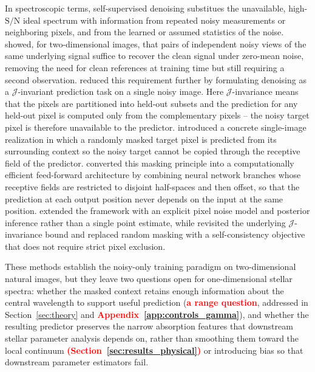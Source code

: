 \documentclass[twocolumn]{aastex7}
\newcommand{\ld}[1]{\textcolor{red}{\textbf{#1}}}
\newcommand{\SNR}{\mathrm{S}/\mathrm{N}}
\begin{document}
In spectroscopic terms, self-supervised denoising substitues the unavailable, high-$\SNR$ ideal spectrum with information from repeated noisy measurements or neighboring pixels, and from the learned or assumed statistics of the noise. \citet{lehtinen2018noise2noise} showed, for two-dimensional images, that pairs of independent noisy views of the same underlying signal suffice to recover the clean signal under zero-mean noise, removing the need for clean references at training time but still requiring a second observation. \citet{batson2019noise2self} reduced this requirement further by formulating denoising as a $\mathcal{J}$-invariant prediction task on a single noisy image. Here $\mathcal{J}$-invariance means that the pixels are partitioned into held-out subsets and the prediction for any held-out pixel is computed only from the complementary pixels -- the noisy target pixel is therefore unavailable to the predictor. \citet{Krull2019_blindspot} introduced a concrete single-image realization in which a randomly masked target pixel is predicted from its surrounding context so the noisy target cannot be copied through the receptive field of the predictor. \citet{Laine2019_BSN} converted this masking principle into a computationally efficient feed-forward architecture by combining neural network branches whose receptive fields are restricted to disjoint half-spaces and then offset, so that the prediction at each output position never depends on the input at the same position. \citet{Krull2020_PN2V} extended the framework with an explicit pixel noise model and posterior inference rather than a single point estimate, while \citet{Xie2020_Noise2Same} revisited the underlying $\mathcal{J}$-invariance bound and replaced random masking with a self-consistency objective that does not require strict pixel exclusion.

These methods establish the noisy-only training paradigm on two-dimensional natural images, but they leave two questions open for one-dimensional stellar spectra: whether the masked context retains enough information about the central wavelength to support useful prediction (\ld{a range question}, addressed in Section~\ref{sec:theory} and \ld{Appendix~\ref{app:controls_gamma}}), and whether the resulting predictor preserves the narrow absorption features that downstream stellar parameter analysis depends on, rather than smoothing them toward the local continuum \ld{(Section~\ref{sec:results_physical})} or introducing bias so that downstream parameter estimators fail.
\end{document}
